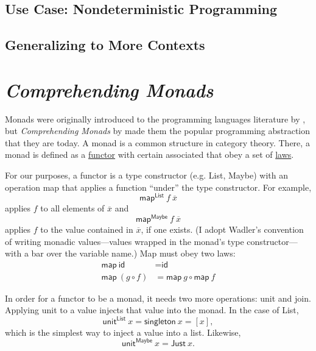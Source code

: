 \documentclass[acmsmall, nonacm, screen]{acmart}
\newcommand{\map}[3]{\textsf{map}^{\textsf{#1}}~#2~#3}
\newcommand{\unit}[2]{\textsf{unit}^{\textsf{#1}}~#2}
\begin{document}
\subsection{Use Case: Nondeterministic Programming}

\subsection{Generalizing to More Contexts}

\section{{\em Comprehending Monads}} \label{sec:wadler}

Monads were originally introduced to the programming languages literature by
\citet{moggi1991notions}, but {\em Comprehending Monads} by \citet{wadler1990comprehending} made
them the popular programming abstraction that they are today. A monad is a common structure in
category theory. There, a monad is defined as a \underline{functor} with certain associated
\underline{} that obey a set of \underline{laws}.

For our purposes, a functor is a type constructor (e.g. \textsf{List}, \textsf{Maybe}) with an
operation \textsf{map} that applies a function ``under'' the type constructor. For example,
\[ \map{List}{f}{\overline{x}} \]
applies $f$ to all elements of $\overline{x}$ and 
\[ \map{Maybe}{f}{\overline{x}} \]
applies $f$ to the value contained in $\overline{x}$, if one exists. (I adopt Wadler's convention
of writing monadic values---values wrapped in the monad's type constructor---with a bar over the
variable name.) Map must obey two laws:
\begin{align*}
  \textsf{map}~\textsf{id} &= \textsf{id} \\
  \textsf{map}~(g \circ f) &= \textsf{map}~g \circ \textsf{map}~f
\end{align*}

In order for a functor to be a monad, it needs two more operations: \textsf{unit} and \textsf{join}.
Applying \textsf{unit} to a value injects that value into the monad. In the case of \textsf{List},
\[ \unit{List}{x} = \textsf{singleton}~x = [x], \]
which is the simplest way to inject a value into a list. Likewise,
\[ \unit{Maybe}{x} = \textsf{Just}~x. \]
\end{document}
